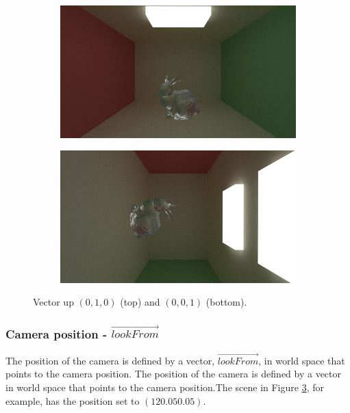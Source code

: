 \documentclass[titlepage,12pt]{report}
\begin{document}
\begin{figure}[H]
	\centering
	\medskip
	\begin{subfigure}{.48\textwidth}
		\centering
		\includegraphics[scale=0.35]{media/cornell_bunny.png}
		\label{cameraupy}
	\end{subfigure}
	\begin{subfigure}{.48\textwidth}
		\centering
		\includegraphics[scale=0.35]{media/cornell_bunny_z_1.png}
		\label{cameraupz}
	\end{subfigure}
	
	\caption{Vector up $(0,1,0)$ (top) and $(0,0,1)$ (bottom).}
	\label{cameraup}
\end{figure}

\subsubsection{Camera position - $\vec{lookFrom}$}

The position of the camera is defined by a vector, $\vec{lookFrom}$, in world space that points to the camera position. The position of the camera is defined by a vector in world space that points to the camera position.The scene in Figure \ref{cameraup}, for example, has the position set to $(12 0.05 0.05)$.
\end{document}
